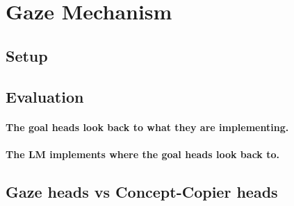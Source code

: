 \section{Gaze Mechanism}
\label{app:gaze}

\subsection{Setup}

\subsection{Evaluation}

\paragraph{The goal heads look back to what they are implementing.}

\paragraph{The LM implements where the goal heads look back to.}

\subsection{Gaze heads vs Concept-Copier heads}
